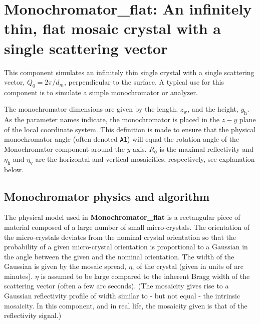 \section{Monochromator\_flat: An infinitely thin, flat mosaic crystal with
a single scattering vector}
\label{s:monochromator_flat}


This component simulates an infinitely thin single
crystal with a single scattering vector, $Q_0=2\pi / d_m$, perpendicular to the
surface. A typical
use for this component is to simulate a simple monochromator or analyzer.

The monochromator dimensions are given by the length, $z_\textrm{w}$, and
the height, $y_\textrm{h}$. As the parameter names indicate, the
monochromator is placed in the $z-y$ plane of the local coordinate system.
This definition is made to ensure that the physical monochromator angle
(often denoted \verb+A1+) will equal the \MCS rotation angle
of the Monochromator component around the $y$-axis.
$R_0$ is the maximal reflectivity and
$\eta_\textrm{h}$ and $\eta_\textrm{v}$ are the horizontal and vertical mosaicities,
respectively, see explanation below.

\subsection{Monochromator physics and algorithm}
The physical model used in \textbf{Monochromator\_flat} is a rectangular piece of
material composed of a large number of small micro-crystals.
The orientation of the
micro-crystals deviates from the nominal crystal orientation so that the
probability of a given micro-crystal orientation is proportional to a
Gaussian in the angle between the given and the nominal orientation. The
width of the Gaussian is given by the mosaic spread, $\eta$, of the crystal
(given in units of arc minutes).
$\eta$ is assumed to be large compared to the inherent Bragg width of the
scattering vector (often a few arc seconds).
(The mosaicity gives rise to a Gaussian reflectivity profile of width
similar to - but not equal - the intrinsic mosaicity.
In this component, and in real life, the mosaicity given is that of the
reflectivity signal.)


